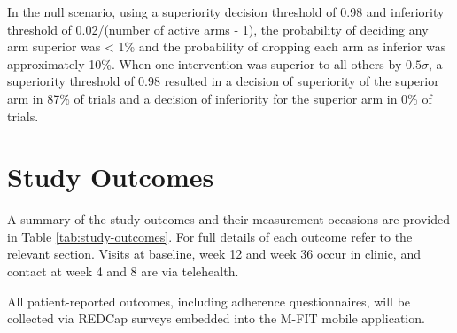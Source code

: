 \documentclass[11pt,parskip=half-]{scrartcl}
\begin{document}
In the null scenario, using a superiority decision threshold of 0.98 and inferiority threshold of 0.02/(number of active arms - 1), the probability of deciding any arm superior was < 1\% and the probability of dropping each arm as inferior was approximately 10\%. When one intervention was superior to all others by $0.5\sigma$, a superiority threshold of 0.98 resulted in a decision of superiority of the superior arm in 87\% of trials and a decision of inferiority for the superior arm in 0\% of trials.

\clearpage

\section{Study Outcomes}\label{outcomes}

A summary of the study outcomes and their measurement occasions are provided in Table \ref{tab:study-outcomes}. For full details of each outcome refer to the relevant section. Visits at baseline, week 12 and week 36 occur in clinic, and contact at week 4 and 8 are via telehealth.

All patient-reported outcomes, including adherence questionnaires, will be collected via REDCap surveys embedded into the M-FIT mobile application.
\end{document}

